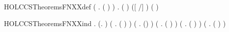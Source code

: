 \begin{SaveVerbatim}{HOLCCSTheoremsFNXXdef}
   (\HOLSymConst{\HOLTokenForall{}} .  ( )  \HOLSymConst{=} \HOLTokenLeftbrace{}\HOLTokenRightbrace{}) \HOLSymConst{\HOLTokenConj{}}
   \HOLSymConst{\HOLTokenForall{}}  .
        (  )  \HOLSymConst{=}
             ([  /] ) (  )
        \HOLTokenLeftbrace{}\HOLTokenRightbrace{}
\end{SaveVerbatim}
\newcommand{\HOLCCSTheoremsFNXXdef}{\UseVerbatim{HOLCCSTheoremsFNXXdef}}
\begin{SaveVerbatim}{HOLCCSTheoremsFNXXind}
\HOLTokenTurnstile{} \HOLSymConst{\HOLTokenForall{}}.
       (\HOLSymConst{\HOLTokenForall{}}.   ) \HOLSymConst{\HOLTokenConj{}} (\HOLSymConst{\HOLTokenForall{}}  .    \HOLSymConst{\HOLTokenImp{}}  ( ) ) \HOLSymConst{\HOLTokenConj{}}
       (\HOLSymConst{\HOLTokenForall{}} .    \HOLSymConst{\HOLTokenImp{}}  (\HOLConst{\ensuremath{\tau}}) ) \HOLSymConst{\HOLTokenConj{}}
       (\HOLSymConst{\HOLTokenForall{}}  .    \HOLSymConst{\HOLTokenConj{}}    \HOLSymConst{\HOLTokenImp{}}  ( \HOLSymConst{\ensuremath{+}} ) ) \HOLSymConst{\HOLTokenConj{}}
       (\HOLSymConst{\HOLTokenForall{}}  .    \HOLSymConst{\HOLTokenConj{}}    \HOLSymConst{\HOLTokenImp{}}  ( \HOLSymConst{\ensuremath{\parallel}} ) ) \HOLSymConst{\HOLTokenConj{}}
       (\HOLSymConst{\HOLTokenForall{}}  .    \HOLSymConst{\HOLTokenImp{}}  (\HOLConst{\ensuremath{\nu}}  ) ) \HOLSymConst{\HOLTokenConj{}}

\end{SaveVerbatim}
